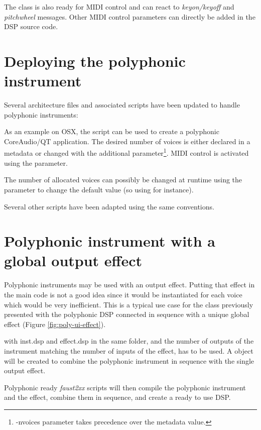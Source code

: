 The  class is also ready for MIDI control and can react to \textit{keyon/keyoff} and \textit{pitchwheel} messages. Other MIDI control parameters can directly be added in the DSP source code. 

\section{Deploying the polyphonic instrument}

Several architecture files and associated scripts have been updated to handle polyphonic instruments:

As an example on OSX, the script  can be used to create a polyphonic CoreAudio/QT application. The desired number of voices is either declared in a  metadata or changed with the  additional parameter\footnote{-nvoices parameter takes precedence over the  metadata value.}. MIDI control is activated using the  parameter. 

The number of allocated voices can possibly be changed at runtime using the  parameter to change the default value (so using  for instance). 

Several other scripts have been adapted using the same conventions.

\section{Polyphonic instrument with a global output effect}

Polyphonic instruments may be used with an output effect. Putting that effect in the main \faust code is not a good idea since it would be instantiated for each voice which would be very inefficient. This is a typical use case for the   class previously presented with the polyphonic DSP connected in sequence with a unique global effect (Figure \ref{fig:poly-ui-effect}). 

 with inst.dsp and effect.dsp in the same folder,  and the number of outputs of the instrument matching the number of inputs of the effect, has to be used. A  object will be created to combine the polyphonic instrument in sequence with the single output effect. 

Polyphonic ready  \textit{faust2xx} scripts will then compile the polyphonic instrument and the effect, combine them in sequence, and create a ready to use DSP.  

